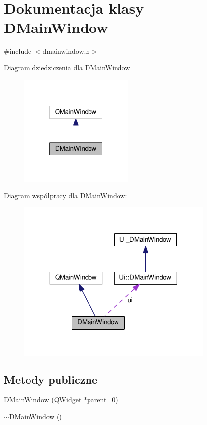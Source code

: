 \hypertarget{class_d_main_window}{\section{Dokumentacja klasy D\-Main\-Window}
\label{class_d_main_window}
}


{\ttfamily \#include $<$dmainwindow.\-h$>$}



Diagram dziedziczenia dla D\-Main\-Window\nopagebreak
\begin{figure}[H]
\begin{center}
\leavevmode
\includegraphics[width=160pt]{class_d_main_window__inherit__graph}
\end{center}
\end{figure}


Diagram współpracy dla D\-Main\-Window\-:\nopagebreak
\begin{figure}[H]
\begin{center}
\leavevmode
\includegraphics[width=274pt]{class_d_main_window__coll__graph}
\end{center}
\end{figure}
\subsection*{Metody publiczne}
\begin{DoxyCompactItemize}
\item 
\hyperlink{class_d_main_window_a5eb52e50cb0f15345279e161eed68389}{D\-Main\-Window} (Q\-Widget $\ast$parent=0)
\item 
\hyperlink{class_d_main_window_acca34964f553e9e18371434ad8dc171c}{$\sim$\-D\-Main\-Window} ()
\end{DoxyCompactItemize}
